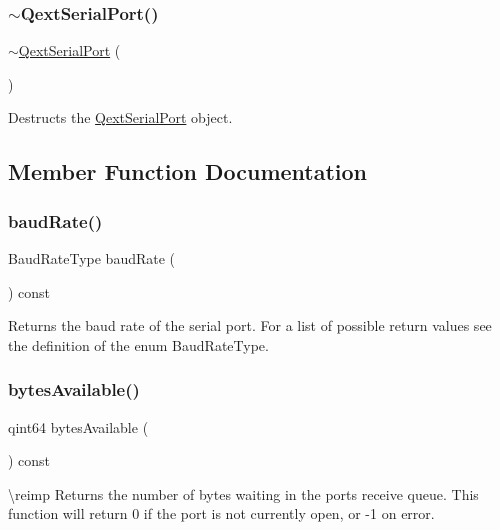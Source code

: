 \subsubsection{\texorpdfstring{$\sim$QextSerialPort()}{~QextSerialPort()}}
{\footnotesize\ttfamily $\sim$\mbox{\hyperlink{class_qext_serial_port}{Qext\+Serial\+Port}} (\begin{DoxyParamCaption}{ }\end{DoxyParamCaption})}

Destructs the \mbox{\hyperlink{class_qext_serial_port}{Qext\+Serial\+Port}} object. 

\subsection{Member Function Documentation}
\mbox{\label{class_qext_serial_port_aca6d359f346c3938ee13fef282fc4844}} 
\subsubsection{\texorpdfstring{baudRate()}{baudRate()}}
{\footnotesize\ttfamily Baud\+Rate\+Type baud\+Rate (\begin{DoxyParamCaption}{ }\end{DoxyParamCaption}) const}

Returns the baud rate of the serial port. For a list of possible return values see the definition of the enum Baud\+Rate\+Type. \mbox{\label{class_qext_serial_port_ada77ba7eed0c66635d6d856e43d30556}} 
\subsubsection{\texorpdfstring{bytesAvailable()}{bytesAvailable()}}
{\footnotesize\ttfamily qint64 bytes\+Available (\begin{DoxyParamCaption}{ }\end{DoxyParamCaption}) const}

\textbackslash{}reimp Returns the number of bytes waiting in the port\textquotesingle{}s receive queue. This function will return 0 if the port is not currently open, or -\/1 on error. \mbox{\label{class_qext_serial_port_a05b7cf4fc998401b7cf8a8851fdd7a02}} 
